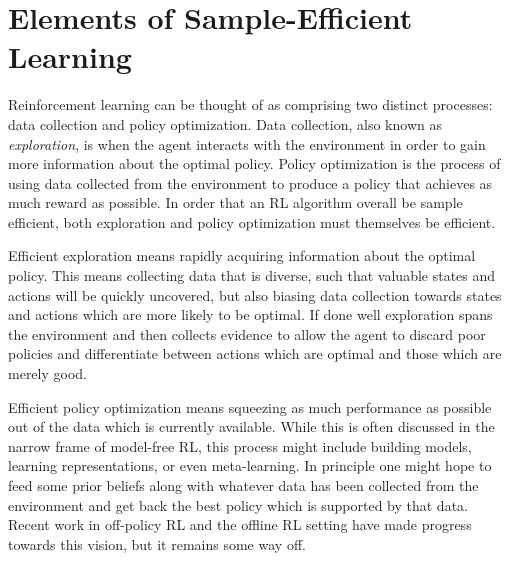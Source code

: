 




\section{Elements of Sample-Efficient Learning}

Reinforcement learning can be thought of as comprising two distinct processes: data collection and policy optimization.
Data collection, also known as \emph{exploration}, is when the agent interacts with the environment in order to gain more information about the optimal policy.
Policy optimization is the process of using data collected from the environment to produce a policy that achieves as much reward as possible.
In order that an RL algorithm overall be sample efficient, both exploration and policy optimization must themselves be efficient.

Efficient exploration means rapidly acquiring information about the optimal policy.
This means collecting data that is diverse, such that valuable states and actions will be quickly uncovered, but also biasing data collection towards states and actions which are more likely to be optimal.
If done well exploration spans the environment and then collects evidence to allow the agent to discard poor policies and differentiate between actions which are optimal and those which are merely good.

Efficient policy optimization means squeezing as much performance as possible out of the data which is currently available.
While this is often discussed in the narrow frame of model-free RL, this process might include building models, learning representations, or even meta-learning.
In principle one might hope to feed some prior beliefs along with whatever data has been collected from the environment and get back the best policy which is supported by that data.
Recent work in off-policy RL and the offline RL setting have made progress towards this vision, but it remains some way off.



